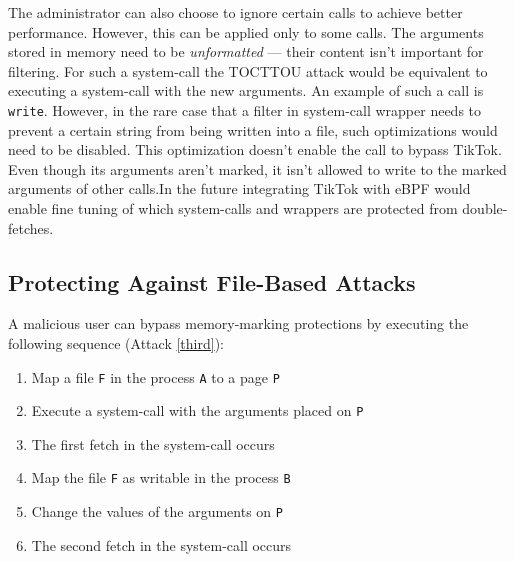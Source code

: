 %

The administrator can also choose to ignore certain calls to achieve better
performance. However, this can be applied only to some calls. The arguments
stored in memory need to be \emph{unformatted} --- their content isn't important
for filtering. For such a system-call the TOCTTOU attack would be equivalent to executing
a system-call with the new arguments. An example of such a call is
\texttt{write}. However, in the rare case that a filter in system-call wrapper
needs to prevent a certain string from being written into a file, such
optimizations would need to be disabled. This optimization doesn't enable the
call to bypass TikTok. Even though its arguments aren't marked, it isn't allowed
to write to the marked arguments of other calls.In the future integrating TikTok
with eBPF would enable fine tuning of which system-calls and wrappers are
protected from double-fetches.


\subsection{Protecting Against File-Based Attacks}
\label{subsec:filewrites}

A malicious user can bypass memory-marking protections by executing the following
sequence (Attack \ref{third}):

\begin{enumerate}
  \item Map a file \texttt{F} in the process \texttt{A} to a page \texttt{P}
  \item Execute a system-call with the arguments placed on \texttt{P}
  \item The first fetch in the system-call occurs
  \item Map the file \texttt{F} as writable in the process \texttt{B}
  \item Change the values of the arguments on \texttt{P}
  \item The second fetch in the system-call occurs
\end{enumerate}


